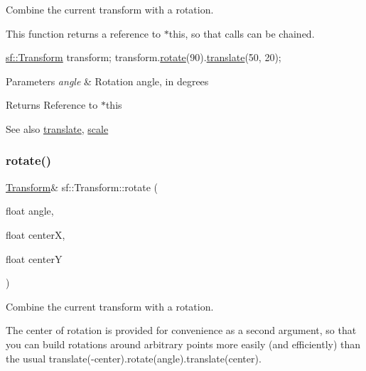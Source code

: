 Combine the current transform with a rotation. 

This function returns a reference to $\ast$this, so that calls can be chained. 
\begin{DoxyCode}
\hyperlink{classsf_1_1_transform}{sf::Transform} transform;
transform.\hyperlink{classsf_1_1_transform_a3e548c3c9e3fb9d4bd43cf852669e555}{rotate}(90).\hyperlink{classsf_1_1_transform_ab54f6c8070cc05e2afcb3145fbf4395a}{translate}(50, 20);
\end{DoxyCode}



\begin{DoxyParams}{Parameters}
{\em angle} & Rotation angle, in degrees\\
\hline
\end{DoxyParams}
\begin{DoxyReturn}{Returns}
Reference to $\ast$this
\end{DoxyReturn}
\begin{DoxySeeAlso}{See also}
\hyperlink{classsf_1_1_transform_ab54f6c8070cc05e2afcb3145fbf4395a}{translate}, \hyperlink{classsf_1_1_transform_a3f46af807f69d74120fb836334268671}{scale} 
\end{DoxySeeAlso}
\mbox{\label{classsf_1_1_transform_af0b7cc3fed36d0fa22d5d331a779eee2}} 
\subsubsection{\texorpdfstring{rotate()}{rotate()}\hspace{0.1cm}{\footnotesize\ttfamily [2/3]}}
{\footnotesize\ttfamily \hyperlink{classsf_1_1_transform}{Transform}\& sf\+::\+Transform\+::rotate (\begin{DoxyParamCaption}\item[{float}]{angle,  }\item[{float}]{centerX,  }\item[{float}]{centerY }\end{DoxyParamCaption})}



Combine the current transform with a rotation. 

The center of rotation is provided for convenience as a second argument, so that you can build rotations around arbitrary points more easily (and efficiently) than the usual translate(-\/center).rotate(angle).translate(center).

